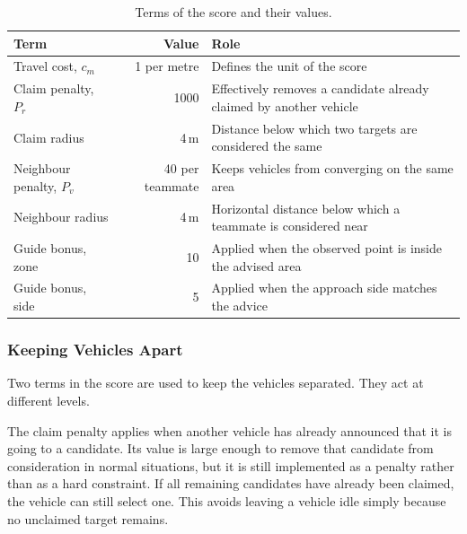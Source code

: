 \begin{table}[!htb]
    \centering
    \caption{Terms of the score and their values.}%
    \label{tab:sys:score-terms}
    \setlength{\tabcolsep}{4pt}
    \begin{tabular}{@{}>{\raggedright\arraybackslash}p{4.4cm}
            r
            >{\raggedright\arraybackslash}p{7.2cm}@{}}
        \toprule
        \textbf{Term}                 & \textbf{Value}      & \textbf{Role}                                                      \\
        \midrule
        Travel cost, $c_m$            & 1 per metre         & Defines the unit of the score                                      \\
        \addlinespace
        Claim penalty, $P_r$          & 1000                & Effectively removes a candidate already claimed by another vehicle  \\
        \addlinespace
        Claim radius                  & 4\,m                & Distance below which two targets are considered the same           \\
        \addlinespace
        Neighbour penalty, $P_v$      & 40 per teammate     & Keeps vehicles from converging on the same area                    \\
        \addlinespace
        Neighbour radius              & 4\,m                & Horizontal distance below which a teammate is considered near      \\
        \addlinespace
        Guide bonus, zone             & 10                  & Applied when the observed point is inside the advised area         \\
        \addlinespace
        Guide bonus, side             & 5                   & Applied when the approach side matches the advice                  \\
        \bottomrule
    \end{tabular}
\end{table}

\FloatBarrier

\subsubsection*{Keeping Vehicles Apart}

Two terms in the score are used to keep the vehicles separated. They act at
different levels.

The claim penalty applies when another vehicle has already announced that it is
going to a candidate. Its value is large enough to remove that candidate from
consideration in normal situations, but it is still implemented as a penalty
rather than as a hard constraint. If all remaining candidates have already been
claimed, the vehicle can still select one. This avoids leaving a vehicle idle
simply because no unclaimed target remains.

